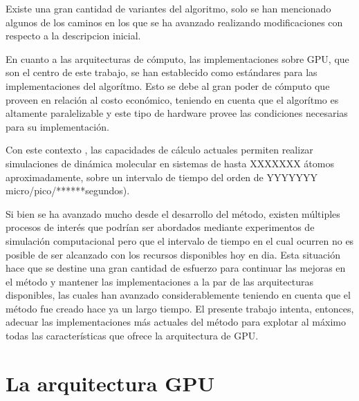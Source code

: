\documentclass[a4paper,10pt]{report}
\begin{document}
Existe una gran cantidad de variantes del algoritmo, solo se han mencionado algunos de los caminos en los que se ha avanzado realizando modificaciones con respecto a la descripcion inicial.

En cuanto a las arquitecturas de cómputo, las implementaciones sobre GPU, que son el centro de este trabajo, se han establecido como estándares para las implementaciones del algorítmo. 
Esto se debe al gran poder de cómputo que proveen en relación al costo económico, teniendo en cuenta que el algorítmo es altamente paralelizable y este tipo de hardware provee las condiciones necesarias para su implementación.

Con este contexto , las capacidades de cálculo actuales permiten realizar simulaciones de dinámica molecular en sistemas de hasta XXXXXXX átomos aproximadamente, sobre un intervalo de tiempo del orden de YYYYYYY  micro/pico/******segundos).

Si bien se ha avanzado mucho desde el desarrollo del método, existen múltiples procesos de interés que podrían ser abordados mediante experimentos de simulación computacional pero que el intervalo de tiempo en el cual ocurren no es posible de ser alcanzado con los recursos disponibles hoy en dia.
Esta situación hace que se destine una gran cantidad de esfuerzo para continuar las mejoras en el método y mantener las implementaciones a la par de las arquitecturas disponibles, las cuales han avanzado considerablemente teniendo en cuenta que el método fue creado hace ya un largo tiempo.
El presente trabajo intenta, entonces, adecuar las implementaciones más actuales del método para explotar al máximo todas las características que ofrece la arquitectura de GPU. 
















\chapter{La arquitectura GPU}
\end{document}
